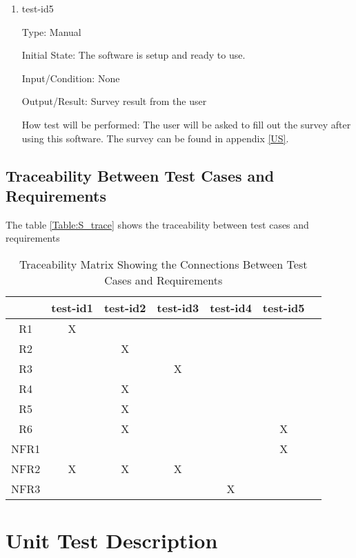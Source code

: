 \documentclass[12pt, titlepage]{article}
\begin{document}
\begin{enumerate}

  \item{test-id5\\}
  
  Type: Manual
  
  Initial State: The software is setup and ready to use.
  
  Input/Condition: None
  
  Output/Result: Survey result from the user
  
  How test will be performed: The user will be asked to fill out the survey after using this software. The survey can be found in appendix \ref{US}.
  
  
  \end{enumerate}

\subsection{Traceability Between Test Cases and Requirements}

The table \ref{Table:S_trace}
 shows the traceability between test cases and requirements

\begin{table}[h!]\label{Table:S_trace}
  \centering
  \begin{tabular}{|c|c|c|c|c|c|c|}
  \hline
    & test-id1& test-id2& test-id3&test-id4&test-id5 \\
  \hline
  R1        & X&  & & &  \\ \hline
  R2        & & X& & &  \\ \hline
  R3        & & & X& & \\ \hline
  R4        & & X& & & \\ \hline
  R5        & &X & & & \\ \hline
  R6        & &X & & & X\\ \hline
  NFR1      & & & & &  X\\ \hline
  NFR2      &X & X& X& & \\ \hline
  NFR3      & & & &X & \\ \hline
  \end{tabular}
  \caption{Traceability Matrix Showing the Connections Between Test Cases and Requirements}
  \label{Table:A_trace}
  \end{table}

\section{Unit Test Description}\label{UnitTest}
\end{document}
